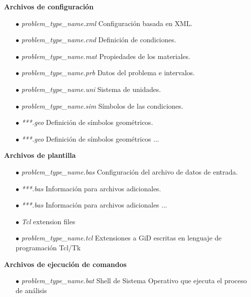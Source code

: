 \documentclass[a4paper,10pt, oneside]{book}
\begin{document}
\vspace*{0.25in}

\begin{Large}
  \textbf{Archivos de configuración}
\end{Large}

\begin{itemize}
  \item[$\bullet$] \textit{problem\_{type}\_{name.xml}} Configuración basada en XML.
  \item[$\bullet$] \textit{problem\_{}type\_{}name.cnd} Definición de condiciones.
  \item[$\bullet$] \textit{problem\_{}type\_{}name.mat} Propiedades de los materiales.
  \item[$\bullet$] \textit{problem\_{}type\_{}name.prb} Datos del problema e intervalos.
  \item[$\bullet$] \textit{problem\_{}type\_{}name.uni} Sistema de unidades.
  \item[$\bullet$] \textit{problem\_{}type\_{}name.sim} Símbolos de las condiciones.
  \item[$\bullet$] \textit{***.geo} Definición de símbolos geométricos.
  \item[$\bullet$] \textit{***.geo} Definición de símbolos geométricos ...
\end{itemize}

\vspace*{0.25in}

\begin{Large}
  \textbf{Archivos de plantilla}
\end{Large}

\begin{itemize}
  \item[$\bullet$] \textit{problem\_{}type\_{}name.bas} Configuración del archivo de datos de entrada.
  \item[$\bullet$] \textit{***.bas} Información para archivos adicionales.
  \item[$\bullet$] \textit{***.bas} Información para archivos adicionales ...
  \vspace*{0.2in}
  \item[$\bullet$] \textit{Tcl} extension files
  \item[$\bullet$] \textit{problem\_{}type\_{}name.tcl} Extensiones a GiD escritas en lenguaje de programación Tcl/Tk
\end{itemize}

\textbf{Archivos de ejecución de comandos}

\begin{itemize}
  \item[$\bullet$] \textit{problem\_{}type\_{}name.bat} Shell de Sistema Operativo que ejecuta el proceso de
análisis
\end{itemize}
\end{document}
